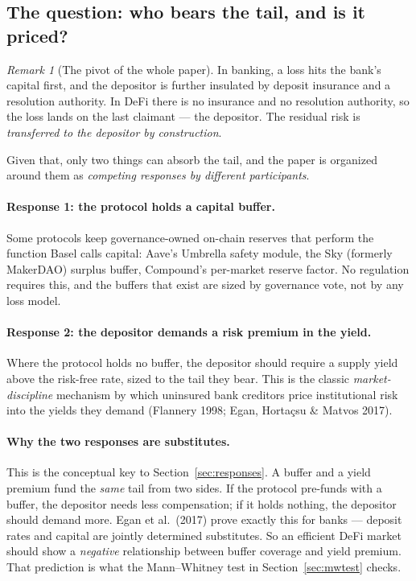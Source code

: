 \documentclass[11pt]{article}
\theoremstyle{definition}
\theoremstyle{remark}
\newtheorem{remark}[theorem]{Remark}
\theoremstyle{definition}
\newcommand{\1}{\mathbf{1}}
\begin{document}
\subsection{The question: who bears the tail, and is it priced?}\label{sec:question}

\begin{remark}[The pivot of the whole paper]
In banking, a loss hits the bank's capital first, and the depositor is further
insulated by deposit insurance and a resolution authority. In DeFi there is no
insurance and no resolution authority, so the loss lands on the last claimant
--- the depositor. The residual risk is \emph{transferred to the depositor by
construction}.
\end{remark}

Given that, only two things can absorb the tail, and the paper is organized
around them as \emph{competing responses by different participants}.

\paragraph{Response 1: the protocol holds a capital buffer.}
Some protocols keep governance-owned on-chain reserves that perform the
function Basel calls capital: Aave's Umbrella safety module, the Sky (formerly
MakerDAO) surplus buffer, Compound's per-market reserve factor. No regulation
requires this, and the buffers that exist are sized by governance vote, not by
any loss model.

\paragraph{Response 2: the depositor demands a risk premium in the yield.}
Where the protocol holds no buffer, the depositor should require a supply yield
above the risk-free rate, sized to the tail they bear. This is the classic
\emph{market-discipline} mechanism by which uninsured bank creditors price
institutional risk into the yields they demand (Flannery 1998; Egan,
Horta\c{c}su \& Matvos 2017).

\paragraph{Why the two responses are substitutes.}
This is the conceptual key to Section~\ref{sec:responses}. A buffer and a yield
premium fund the \emph{same} tail from two sides. If the protocol pre-funds
with a buffer, the depositor needs less compensation; if it holds nothing, the
depositor should demand more. Egan et al.\ (2017) prove exactly this for banks
--- deposit rates and capital are jointly determined substitutes. So an
efficient DeFi market should show a \emph{negative} relationship between buffer
coverage and yield premium. That prediction is what the Mann--Whitney test in
Section~\ref{sec:mwtest} checks.
\end{document}
